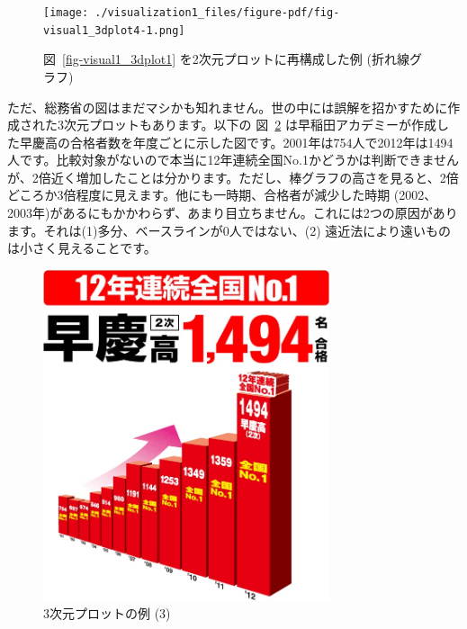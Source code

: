 \documentclass[
  a4paper,
  pandoc,
  ja=standard,
  jafont=haranoaji]{bxjsbook}
\begin{document}
\begin{figure}

{\centering \texttt{[image: ./visualization1\_files/figure-pdf/fig-visual1\_3dplot4-1.png]}

}

\caption{\label{fig-visual1_3dplot4}図~\ref{fig-visual1_3dplot1}
を2次元プロットに再構成した例 (折れ線グラフ)}

\end{figure}

ただ、総務省の図はまだマシかも知れません。世の中には誤解を招かすために作成された3次元プロットもあります。以下の
図~\ref{fig-visual1_3dplot5}
は早稲田アカデミーが作成した早慶高の合格者数を年度ごとに示した図です。2001年は754人で2012年は1494人です。比較対象がないので本当に12年連続全国No.1かどうかは判断できませんが、2倍近く増加したことは分かります。ただし、棒グラフの高さを見ると、2倍どころか3倍程度に見えます。他にも一時期、合格者が減少した時期
(2002、2003年)があるにもかかわらず、あまり目立ちません。これには2つの原因があります。それは(1)多分、ベースラインが0人ではない、(2)
遠近法により遠いものは小さく見えることです。

\begin{figure}

{\centering \includegraphics[width=0.75\textwidth,height=\textheight]{./Figs/Visualization1/garbage_graph3.jpg}

}

\caption{\label{fig-visual1_3dplot5}3次元プロットの例 (3)}

\end{figure}
\end{document}
